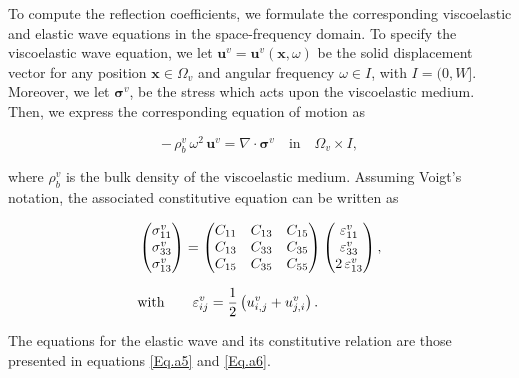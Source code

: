 \documentclass[draft]{agujournal2019}
\begin{document}
To compute the reflection coefficients, we formulate the corresponding viscoelastic and elastic wave equations in the space-frequency domain. To specify the viscoelastic wave equation,  we let $\bm{u}^v =\bm{u}^v( \bm{x}, \omega)$  be the solid displacement vector for any position $\bm{x} \in \Omega_v$  and angular frequency $\omega \in I$, with $I =(0,W]$. Moreover, we let $\bm {\sigma}^v$, be the stress which acts upon the viscoelastic medium. Then, we express the corresponding equation of motion as
\begin{linenomath*}
\begin{equation}\label{Eq.b1}
- \, \rho_b^v \,\omega^2 \, \bm{u}^v = \nabla  \cdot \bm{\sigma}^v \quad  \textrm{in} \quad \Omega_v \times I, 
\end{equation}
\end{linenomath*}
where $\rho_b^v$ is the bulk density of the viscoelastic medium.
Assuming Voigt's notation, the associated constitutive equation can be written as
\begin{linenomath*}
\begin{equation}\label{Eq.b2}
\setlength{\jot}{10pt}
\begin{split}
 &
 \begin{pmatrix}
 \sigma_{11}^v\\
 \sigma_{33}^v \\
  \sigma_{13}^v\\
 \end{pmatrix}
 =
   \begin{pmatrix}
  {C}_{11} & {C}_{13} & {C}_{15} \\
  {C}_{13} & {C}_{33} & {C}_{35} \\
  {C}_{15} & {C}_{35} & {C}_{55}\\
 \end{pmatrix}
  \begin{pmatrix}
  \varepsilon_{11}^v \\
  \varepsilon_{33}^v  \\
 2\,  \varepsilon_{13}^v \\
 \end{pmatrix},\\
 & \text{with} \qquad \varepsilon_{ij}^v =\frac{1}{2} \left(u_{i,j}^v + u_{j,i}^v\right).
 \end{split}
\end{equation}
\end{linenomath*}

The equations for the elastic wave and its constitutive relation are those presented in equations \eqref{Eq.a5} and \eqref{Eq.a6}.
\end{document}
